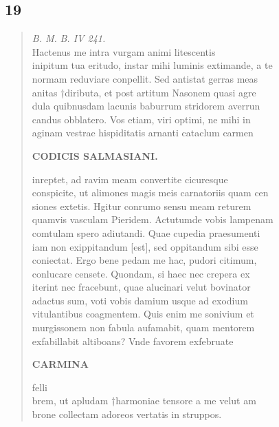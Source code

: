 \documentclass[11pt, a4paper]{report}
\begin{document}
            \subsection*{19}
      \begin{verse}
      \textit{B. M.}  \textit{B. IV 241.} 
                    \\Hactenus me intra vurgam animi litescentis \\ inipitum tua eritudo,
                    instar mihi luminis extimande, a te \\normam reduviare conpellit. Sed
                    antistat gerras meas \\anitas †diributa, et post artitum Nasonem quasi
                        agre\\dula quibnusdam lacunis baburrum stridorem averrun\\candus
                    obblatero. Vos etiam, viri optimi, ne mihi in \\aginam vestrae hispiditatis
                    arnanti cataclum carmen 
        ﻿\pagebreak 
    
                    \begin{center} \textbf{CODICIS SALMASIANI.} \end{center}
                     \marginpar{[83]} 
                    inreptet, ad ravim meam convertite cicuresque \\ conspicite, ut alimones
                    magis meis carnatoriis quam cen\\siones extetis. Hgitur conrumo sensu
                    meam returem \\quamvis vasculam Pieridem. Actutumde vobis lampenam
                    \\comtulam spero adiutandi. Quae cupedia praesumenti \\iam non
                    exippitandum [est], sed oppitandum sibi esse \\coniectat. Ergo bene pedam me
                    hac, pudori citimum, \\conlucare censete. Quondam, si haec nec crepera
                    ex\\iterint nec fracebunt, quae alucinari velut bovinator \\adactus sum,
                    voti vobis damium usque ad exodium \\vitulantibus coagmentem. Quis enim me
                    sonivium et \\murgissonem non fabula aufamabit, quam mentorem
                    \\exfabillabit altiboans? Vnde favorem exfebruate 
        ﻿\pagebreak 
    
                    \begin{center} \textbf{CARMINA} \end{center}
                     \marginpar{[84]}  felli\\brem, ut apludam †harmoniae tensore a me
                    velut am\\brone collectam adoreos vertatis in struppos. 
      \end{verse}
  
\end{document}
